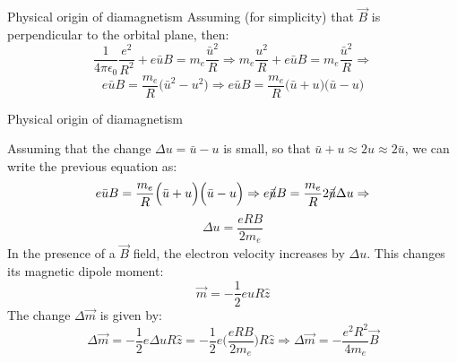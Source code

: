 \begin{frame}{Physical origin of diamagnetism}
Assuming (for simplicity) that $\vec{B}$ is perpendicular to the orbital plane, then:
\begin{equation*}
   \frac{1}{4\pi \epsilon_0} \frac{e^2}{R^2} + e \bar{u} B = m_e \frac{\bar{u}^2}{R} \Rightarrow
   m_e \frac{u^2}{R} + e \bar{u} B = m_e \frac{\bar{u}^2}{R} \Rightarrow
\end{equation*}
\begin{equation*}
    e \bar{u} B = \frac{m_e}{R} \Big( \bar{u}^2 - u^2 \Big) \Rightarrow
    e \bar{u} B = \frac{m_e}{R} \Big( \bar{u} + u \Big)  \Big( \bar{u} - u \Big)
\end{equation*}

\end{frame}


%
%
%

\begin{frame}{Physical origin of diamagnetism}

Assuming that the change ${\Delta}u = \bar{u} - u$ is small, so that $\bar{u} + u \approx 2u \approx 2\bar{u}$,
we can write the previous equation as:
\begin{equation*}
    e \bar{u} B = \frac{m_e}{R} \Big( \bar{u} + u \Big)  \Big( \bar{u} - u \Big) \Rightarrow
    e \cancel{\bar{u}} B = \frac{m_e}{R} 2 \cancel{\bar{u}} {\Delta}u \Rightarrow
\end{equation*}
\begin{equation*}
    {\Delta}u = \frac{eRB}{2m_e}
\end{equation*}
In the presence of a $\vec{B}$ field, the electron velocity increases by ${\Delta}u$.
This changes its magnetic dipole moment:
\begin{equation*}
  \vec{m} = - \frac{1}{2} e u R \hat{z}
\end{equation*}
The change $ {\Delta}\vec{m}$ is given by:
\begin{equation*}
    {\Delta}\vec{m} =
      - \frac{1}{2} e {\Delta}u R \hat{z} =
      - \frac{1}{2} e \Big( \frac{eRB}{2m_e} \Big) R \hat{z} \Rightarrow
    {\Delta}\vec{m} =
      - \frac{e^2 R^2}{4m_e} \vec{B}
\end{equation*}

\end{frame}


%
%

